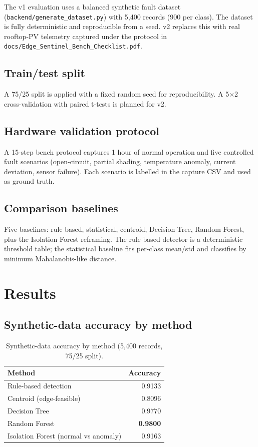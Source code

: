 \documentclass[12pt,journal,onecolumn]{IEEEtran}
\begin{document}
The v1 evaluation uses a balanced synthetic fault dataset
(\texttt{backend/generate\_dataset.py}) with 5{,}400 records
(900 per class). The dataset is fully deterministic and reproducible
from a seed. v2 replaces this with real rooftop-PV telemetry captured
under the protocol in
\texttt{docs/Edge\_Sentinel\_Bench\_Checklist.pdf}.

\subsection{Train/test split}

A 75/25 split is applied with a fixed random seed for reproducibility.
A 5$\times$2 cross-validation with paired t-tests is planned for v2.

\subsection{Hardware validation protocol}

A 15-step bench protocol captures 1 hour of normal operation and five
controlled fault scenarios (open-circuit, partial shading, temperature
anomaly, current deviation, sensor failure). Each scenario is labelled
in the capture CSV and used as ground truth.

\subsection{Comparison baselines}

Five baselines: rule-based, statistical, centroid, Decision Tree,
Random Forest, plus the Isolation Forest reframing. The rule-based
detector is a deterministic threshold table; the statistical baseline
fits per-class mean/std and classifies by minimum Mahalanobis-like
distance.

\section{Results}
\label{sec:results}

\subsection{Synthetic-data accuracy by method}

\begin{table}[h]
\caption{Synthetic-data accuracy by method (5{,}400 records, 75/25 split).}
\label{tab:acc}
\centering
\begin{tabular}{lr}
\toprule
Method & Accuracy \\
\midrule
Rule-based detection & 0.9133 \\
Centroid (edge-feasible) & 0.8096 \\
Decision Tree & 0.9770 \\
Random Forest & \textbf{0.9800} \\
Isolation Forest (normal vs anomaly) & 0.9163 \\
\bottomrule
\end{tabular}
\end{table}
\end{document}
